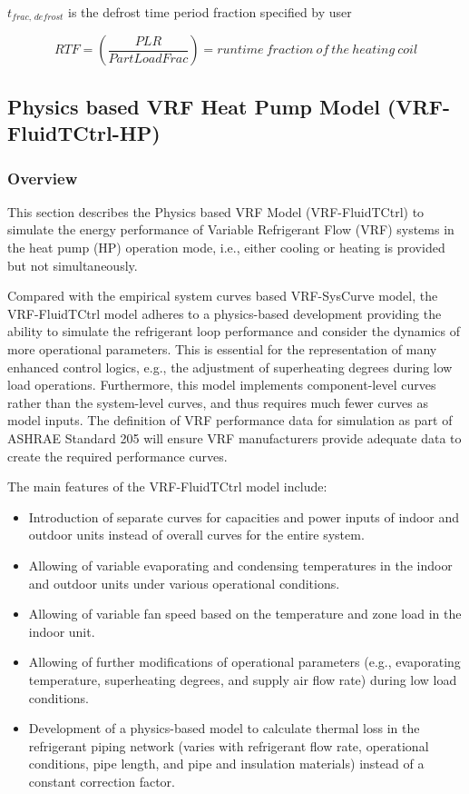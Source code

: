 \(t_{frac,\,defrost}\) is the defrost time period fraction specified by user

\begin{equation}
  RTF = \left(  \frac{PLR}{PartLoadFrac} \right) = runtime~fraction~of~the~heating~coil
\end{equation}

\subsection{Physics based VRF Heat Pump Model (VRF-FluidTCtrl-HP)}\label{VRF-FluidTCtrl-HP}

\subsubsection{Overview}\label{VRF-FluidTCtrl-HP-overview}

This section describes the Physics based VRF Model (VRF-FluidTCtrl) to simulate the energy performance of Variable Refrigerant Flow (VRF) systems in the heat pump (HP) operation mode, i.e., either cooling or heating is provided but not simultaneously.

Compared with the empirical system curves based VRF-SysCurve model, the VRF-FluidTCtrl model adheres to a physics-based development providing the ability to simulate the refrigerant loop performance and consider the dynamics of more operational parameters. This is essential for the representation of many enhanced control logics, e.g., the adjustment of superheating degrees during low load operations. Furthermore, this model implements component-level curves rather than the system-level curves, and thus requires much fewer curves as model inputs. The definition of VRF performance data for simulation as part of ASHRAE Standard 205 will ensure VRF manufacturers provide adequate data to create the required performance curves.

The main features of the VRF-FluidTCtrl model include:

\begin{itemize}
  \item
   Introduction of separate curves for capacities and power inputs of indoor and outdoor units instead of overall curves for the entire system.
 \item
   Allowing of variable evaporating and condensing temperatures in the indoor and outdoor units under various operational conditions.
\item
  Allowing of variable fan speed based on the temperature and zone load in the indoor unit.
\item
  Allowing of further modifications of operational parameters (e.g., evaporating temperature, superheating degrees, and supply air flow rate) during low load conditions.
\item
  Development of a physics-based model to calculate thermal loss in the refrigerant piping network (varies with refrigerant flow rate, operational conditions, pipe length, and pipe and insulation materials) instead of a constant correction factor.
\end{itemize}

